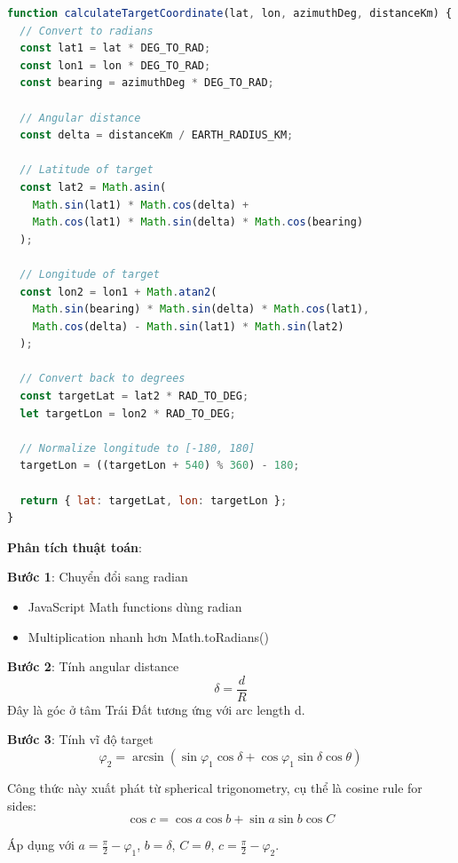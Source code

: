 \begin{lstlisting}[language=JavaScript, caption={Haversine forward problem}]
function calculateTargetCoordinate(lat, lon, azimuthDeg, distanceKm) {
  // Convert to radians
  const lat1 = lat * DEG_TO_RAD;
  const lon1 = lon * DEG_TO_RAD;
  const bearing = azimuthDeg * DEG_TO_RAD;
  
  // Angular distance
  const delta = distanceKm / EARTH_RADIUS_KM;
  
  // Latitude of target
  const lat2 = Math.asin(
    Math.sin(lat1) * Math.cos(delta) +
    Math.cos(lat1) * Math.sin(delta) * Math.cos(bearing)
  );
  
  // Longitude of target
  const lon2 = lon1 + Math.atan2(
    Math.sin(bearing) * Math.sin(delta) * Math.cos(lat1),
    Math.cos(delta) - Math.sin(lat1) * Math.sin(lat2)
  );
  
  // Convert back to degrees
  const targetLat = lat2 * RAD_TO_DEG;
  let targetLon = lon2 * RAD_TO_DEG;
  
  // Normalize longitude to [-180, 180]
  targetLon = ((targetLon + 540) % 360) - 180;
  
  return { lat: targetLat, lon: targetLon };
}
\end{lstlisting}

\textbf{Phân tích thuật toán}:

\textbf{Bước 1}: Chuyển đổi sang radian
\begin{itemize}
    \item JavaScript Math functions dùng radian
    \item Multiplication nhanh hơn Math.toRadians()
\end{itemize}

\textbf{Bước 2}: Tính angular distance
\begin{equation}
\delta = \frac{d}{R}
\end{equation}
Đây là góc ở tâm Trái Đất tương ứng với arc length d.

\textbf{Bước 3}: Tính vĩ độ target
\begin{equation}
\varphi_2 = \arcsin(\sin\varphi_1 \cos\delta + \cos\varphi_1 \sin\delta \cos\theta)
\end{equation}

Công thức này xuất phát từ spherical trigonometry, cụ thể là cosine rule for sides:
\begin{equation}
\cos c = \cos a \cos b + \sin a \sin b \cos C
\end{equation}

Áp dụng với $a = \frac{\pi}{2} - \varphi_1$, $b = \delta$, $C = \theta$, $c = \frac{\pi}{2} - \varphi_2$.

